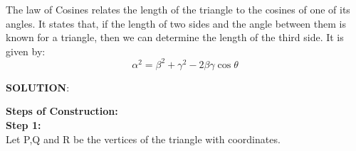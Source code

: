 \documentclass[10pt,a4paper]{article}
\begin{document}
\begin{multicols}{2}
The law of Cosines relates the length of the triangle to the cosines of one of its angles. It states that, if the length of two sides and the angle between them is known for a triangle, then we can determine the length of the third side. It is given by:
\begin{equation}
\alpha^2=\beta^2+\gamma^2-2\beta\gamma\cos\theta
\end{equation}
\raggedright \textbf{SOLUTION}:\vspace{5mm}\\
\raggedright \textbf{Steps of Construction:}\vspace{2mm}\\
\textbf{Step 1:}\vspace{2mm}\\
Let P,Q and R be the vertices of the triangle  with coordinates.


\end{multicols}
\end{document}
